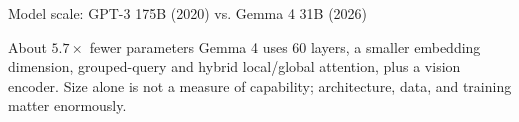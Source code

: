 \begin{frame}{Model scale: GPT-3 175B (2020) vs. Gemma 4 31B (2026)}
  \vspace{-0.6em}
  \begin{alertblock}{About \(5.7\times\) fewer parameters}
    \footnotesize
    Gemma 4 uses 60 layers, a smaller embedding dimension, grouped-query and
    hybrid local/global attention, plus a vision encoder. Size alone is not a
    measure of capability; architecture, data, and training matter enormously.
  \end{alertblock}

\end{frame}
